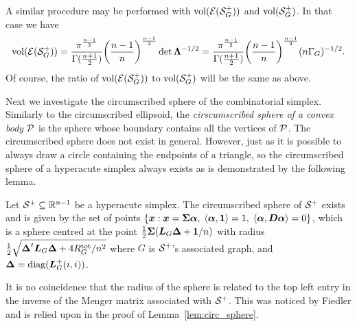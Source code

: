 A similar procedure may be performed  with $\vol(\El(\splx_G^+))$  and $\vol(\splx_G^+)$. In that  case we  have 
\begin{align*}
\vol(\El(\splx_G^+)) = \frac{\pi^{\frac{n-1}{2}}}{\Gamma(\frac{n+1}{2})} \bigg(\frac{n-1}{n}\bigg)^{\frac{n-1}{2}} \det\Eval^{-1/2} = \frac{\pi^{\frac{n-1}{2}}}{\Gamma(\frac{n+1}{2})} \bigg(\frac{n-1}{n}\bigg)^{\frac{n-1}{2}} (n\Gamma_G)^{-1/2}.
\end{align*}
Of course, the ratio  of $\vol(\El(\splx_G^+))$ to $\vol(\splx^+_G)$ will be  the same as above. 



Next we investigate the circumscribed sphere of the combinatorial  simplex. Similarly to the circumscribed ellipsoid, the \emph{cirscumscribed sphere  of a convex body $\P$} is the sphere whose boundary contains all the vertices of $\P$. The circumscribed sphere does not exist in general. However, just as it is possible to always draw a circle containing the endpoints  of a triangle, so the circumscribed sphere of a hyperacute simplex always exists  as is demonstrated  by the following lemma.  

\begin{lemma}
	\label{lem:circ_sphere}
	Let $\splx^+\subset\R^{n-1}$ be a hyperacute simplex. The circumscribed sphere  of $\splx^+$ exists and is given by the set of points $\{\x:\x=\Sv\balpha, \; \la \balpha,\one \ra = 1, \; \la \balpha,\D\balpha\ra =0\}$, which is a sphere centred at the point $\frac{1}{2}\Sv(\L_G\bD + \one/n)$ with radius $\frac{1}{2}\sqrt{\bD^\tp\L_G\bD + 4\Rtot_G/n^2}$ where $G$ is $\splx^+$'s associated graph, and $\bD = \diag(\L_G^+(i,i))$. 
\end{lemma}

\begin{remark}
	It is no coincidence that the radius of the sphere is related to the top left entry in the  inverse of the Menger matrix  associated with  $\splx^+$. This was  noticed by Fiedler and is relied  upon in  the proof of Lemma~\ref{lem:circ_sphere}. 
\end{remark}


